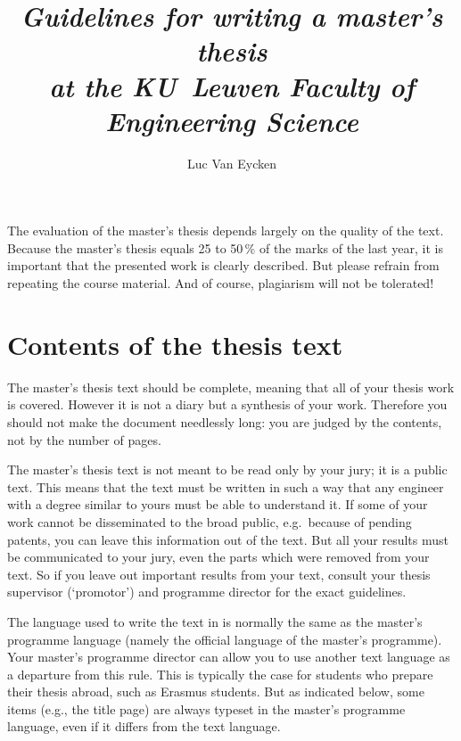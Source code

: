 \documentclass[11pt,article,oneside,british,extralanguage=dutch]{kulemt}
\newcommand\Dutch[1]{`{\selectlanguage{dutch}#1}'}
\begin{document}
\title{\itshape Guidelines for writing a master's thesis \\
  at the KU~Leuven Faculty of Engineering Science}
\author{Luc Van Eycken}
\maketitle
\bigskip

\noindent The evaluation of the master's thesis depends largely on the quality
of the text. Because the master's thesis equals 25 to 50\,\% of the marks of
the last year, it is important that the presented work is clearly described.
But please refrain from repeating the course material. And of course,
plagiarism will not be tolerated!

\medskip
\makeatletter \renewcommand\@tocmaketitle{} \makeatother
\tableofcontents*
\medskip

\chapter{Contents of the thesis text}
The master's thesis text should be complete, meaning that all of your thesis
work is covered. However it is not a diary but a synthesis of your work.
Therefore you should not make the document needlessly long: you are judged
by the contents, not by the number of pages.

The master's thesis text is not meant to be read only by your jury; it is a
public text. This means that the text must be written in such a way that
any engineer with a degree similar to yours must be able to understand it.
If some of your work cannot be disseminated to the broad public, e.g.\
because of pending patents, you can leave this information out of the text.
But all your results must be communicated to your jury, even the parts
which were removed from your text. So if you leave out important results
from your text, consult your thesis supervisor (\Dutch{promotor}) and
programme director for the exact guidelines.

The language used to write the text in is normally the same as the master's
programme language (namely the official language of the master's programme).
Your master's programme director can allow you to use another text language as
a departure from this rule. This is typically the case for students who prepare
their thesis abroad, such as Erasmus students. But as indicated below, some
items (e.g., the title page) are always typeset in the master's programme
language, even if it differs from the text language.
\end{document}
